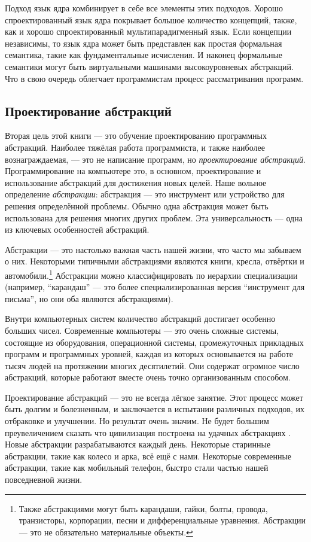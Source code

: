 Подход язык ядра комбинирует в себе все элементы этих подходов. Хорошо спроектированный язык ядра покрывает большое количество концепций, также, как и хорошо спроектированный мультипарадигменный язык. Если концепции независимы, то язык ядра может быть представлен как простая формальная семантика, такие как фундаментальные исчисления. И наконец формальные семантики могут быть виртуальными машинами высокоуровневых абстракций. Что в свою очередь облегчает программистам процесс рассматривания программ.

\subsection*{Проектирование абстракций}

Вторая цель этой книги --- это обучение проектированию программных абстракций. Наиболее тяжёлая работа программиста, и также наиболее вознаграждаемая, --- это не написание программ, но \emph{проектирование абстракций}. Программирование на компьютере это, в основном, проектирование и использование абстракций для достижения новых целей. Наше вольное определение \emph{абстракции}: абстракция --- это инструмент или устройство для решения определённой проблемы. Обычно одна абстракция может быть использована для решения многих других проблем. Эта универсальность --- одна из ключевых особенностей абстракций.

Абстракции --- это настолько важная часть нашей жизни, что часто мы забываем о них. Некоторыми типичными абстракциями являются книги, кресла, отвёртки и автомобили.\footnote{Также абстракциями могут быть карандаши, гайки, болты, провода, транзисторы, корпорации, песни и дифференциальные уравнения. Абстракции --- это не обязательно материальные объекты.} Абстракции можно классифицировать по иерархии специализации (например, ``карандаш'' --- это более специализированная версия ``инструмент для письма'', но они оба являются абстракциями).

Внутри компьютерных систем количество абстракций достигает особенно больших чисел. Современные компьютеры --- это очень сложные системы, состоящие из оборудования, операционной системы, промежуточных прикладных программ и программных уровней, каждая из которых основывается на работе тысяч людей на протяжении многих десятилетий. Они содержат огромное число абстракций, которые работают вместе очень точно организованным способом.

Проектирование абстракций --- это не всегда лёгкое занятие. Этот процесс может быть долгим и болезненным, и заключается в испытании различных подходов, их отбраковке и улучшении. Но результат очень значим. Не будет большим преувеличением сказать что цивилизация построена на удачных абстракциях \cite{134}. Новые абстракции разрабатываются каждый день. Некоторые старинные абстракции, такие как колесо и арка, всё ещё с нами. Некоторые современные абстракции, такие как мобильный телефон, быстро стали частью нашей повседневной жизни.

